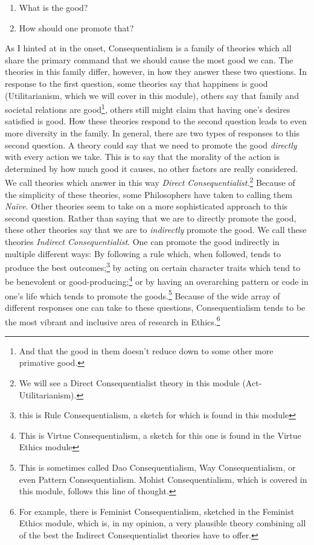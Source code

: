 \begin{enumerate}
\item What is the good?
\item How should one promote that?
\end{enumerate}

As I hinted at in the onset, Consequentialism is a family of theories which all share the primary command that we should cause the most good we can. The theories in this family differ, however, in how they answer these two questions. In response to the first question, some theories say that happiness is good (Utilitarianism, which we will cover in this module), others say that family and societal relations are good\footnote{And that the good in them doesn't reduce down to some other more primative good.}, others still might claim that having one's desires satisfied is good. How these theories respond to the second question leads to even more diversity in the family. In general, there are two types of responses to this second question. A theory could say that we need to promote the good \emph{directly} with every action we take. This is to say that the morality of the action is determined by how much good it causes, no other factors are really considered. We call theories which answer in this way \emph{Direct Consequentialist}.\footnote{We will see a Direct Consequentialist theory in this module (Act-Utilitarianism).} Because of the simplicity of these theories, some Philosophers have taken to calling them \emph{Na\"ive}. Other theories seem to take on a more sophisticated approach to this second question. Rather than saying that we are to directly promote the good, these other theories say that we are to \emph{indirectly} promote the good. We call these theories \emph{Indirect Consequentialist}. One can promote the good indirectly in multiple different ways: By following a rule which, when followed, tends to produce the best outcomes;\footnote{this is Rule Consequentialism, a sketch for which is found in this module} by acting on certain character traits which tend to be benevolent or good-producing;\footnote{This is Virtue Consequentialism, a sketch for this one is found in the Virtue Ethics module} or by having an overarching pattern or code in one's life which tends to promote the goods.\footnote{This is sometimes called Dao Consequentialism, Way Consequentialism, or even Pattern Consequentialism. Mohist Consequentialism, which is covered in this module, follows this line of thought.} Because of the wide array of different responses one can take to these questions, Consequentialism tends to be the most vibrant and inclusive area of research in Ethics.\footnote{For example, there is Feminist Consequentialism, sketched in the Feminist Ethics module, which is, in my opinion, a very plausible theory combining all of the best the Indirect Consequentialist theories have to offer.}   

